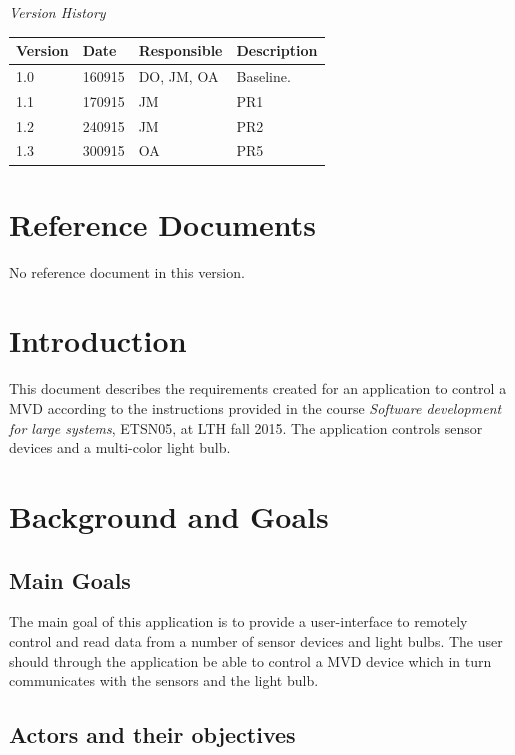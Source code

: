 \documentclass[a4paper]{article}
\begin{document}
\begin{center}
\textit{\large Version History}

    \begin{tabular}{ | l | l | l | p{5cm} |}
    \hline
    \textbf{Version} 	& \textbf{Date} 	& \textbf{Responsible} 	& \textbf{Description} 		\\ \hline
    1.0				 	& 160915 			& DO, JM, OA			&  Baseline. 				\\ \hline
    1.1				 	& 170915 			& JM					&  PR1				\\ \hline
    1.2				 	& 240915 			& JM					&  PR2				\\ \hline
    1.3				 	& 300915 			& OA					&  PR5				\\ \hline
    \end{tabular}
\end{center}


\tableofcontents
\newpage
{}

\section{Reference Documents}
No reference document in this version.

\section{Introduction}
This document describes the requirements created for an application to control a MVD according to the instructions provided in the course \textit{Software development for large systems}, ETSN05, at LTH fall 2015.  The application controls sensor devices and a multi-color light bulb.

\section{Background and Goals}
\subsection{Main Goals}
The main goal of this application is to provide a user-interface to remotely control and read data from a number of sensor devices and light bulbs. The user should through the application be able to control a MVD device which in turn communicates with the sensors and the light bulb.
\subsection{Actors and their objectives}
\end{document}
